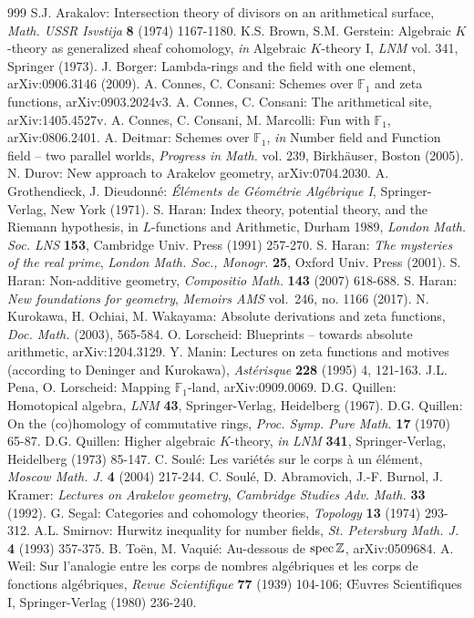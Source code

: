 \documentclass[leqno]{article}
\numberwithin{equation}{section}
\begin{document}
\begin{thebibliography}{999}
 S.J. Arakalov: Intersection theory of divisors on an arithmetical surface, {\it Math. USSR Isvstija} {\bf 8} (1974) 1167-1180.
 K.S. Brown, S.M. Gerstein: Algebraic $K$-theory as generalized sheaf cohomology, {\it in} Algebraic $K$-theory I, {\it LNM} vol. 341, Springer (1973).
 J. Borger: Lambda-rings and the field with one element, arXiv:0906.3146 (2009).
 A. Connes, C. Consani: Schemes over ${\mathbb F}_1$ and zeta functions, arXiv:0903.2024v3.
 A. Connes, C. Consani: The arithmetical site, arXiv:1405.4527v.
 A. Connes, C. Consani, M. Marcolli: Fun with ${\mathbb F}_1$, arXiv:0806.2401.
 A. Deitmar: Schemes over ${\mathbb F}_1$, {\it in} Number field and Function field -- two parallel worlds, {\it Progress in Math.} vol. 239, Birkh\"auser, Boston (2005).
 N. Durov: New approach to Arakelov geometry, arXiv:0704.2030.
 A. Grothendieck, J. Dieudonn\'e: {\it \'El\'ements de G\'eom\'etrie Alg\'ebrique I}, Springer-Verlag, New York (1971).
 S. Haran: Index theory, potential theory, and the Riemann hypothesis, in $L$-functions and Arithmetic, Durham 1989, {\it London Math. Soc. LNS} {\bf 153}, Cambridge Univ. Press (1991) 257-270.
 S. Haran: {\it The mysteries of the real prime}, {\it London Math. Soc., Monogr.} {\bf 25}, Oxford Univ. Press (2001).
 S. Haran: Non-additive geometry, {\it Compositio Math.} {\bf 143} (2007) 618-688.
 S. Haran: {\it New foundations for geometry}, {\it Memoirs AMS} vol.~246, no. 1166 (2017).
 N. Kurokawa, H. Ochiai, M. Wakayama: Absolute derivations and zeta functions, {\it Doc. Math.} (2003), 565-584.
 O. Lorscheid: Blueprints -- towards absolute arithmetic, arXiv:1204.3129.
 Y. Manin: Lectures on zeta functions and motives (according to Deninger and Kurokawa), {\it Ast\'erisque} {\bf 228} (1995) 4, 121-163.
 J.L. Pena, O. Lorscheid: Mapping ${\mathbb F}_1$-land, arXiv:0909.0069.
 D.G. Quillen: Homotopical algebra, {\it LNM} {\bf 43}, Springer-Verlag, Heidelberg (1967).
 D.G. Quillen: On the (co)homology of commutative rings, {\it Proc. Symp. Pure Math.} {\bf 17} (1970) 65-87.
 D.G. Quillen: Higher algebraic $K$-theory, {\it in} {\it LNM} {\bf 341}, Springer-Verlag, Heidelberg (1973) 85-147.
 C. Soul\'e: Les vari\'et\'es sur le corps \`a un \'el\'ement, {\it Moscow Math. J.} {\bf 4} (2004) 217-244.
 C. Soul\'e, D. Abramovich, J.-F. Burnol, J. Kramer: {\it Lectures on Arakelov geometry}, {\it Cambridge Studies Adv. Math.} {\bf 33} (1992).
 G. Segal: Categories and cohomology theories, {\it Topology} {\bf 13} (1974) 293-312.
 A.L. Smirnov: Hurwitz inequality for number fields, {\it St. Petersburg Math. J.} {\bf 4} (1993) 357-375.
 B. To\"en, M. Vaqui\'e: Au-dessous de ${\rm spec} \, {\mathbb Z}$, arXiv:0509684.
 A. Weil: Sur l'analogie entre les corps de nombres alg\'ebriques et les corps de fonctions alg\'ebriques, {\it Revue Scientifique} {\bf 77} (1939) 104-106; \OE uvres Scientifiques I, Springer-Verlag (1980) 236-240.
\end{thebibliography}
\end{document}
